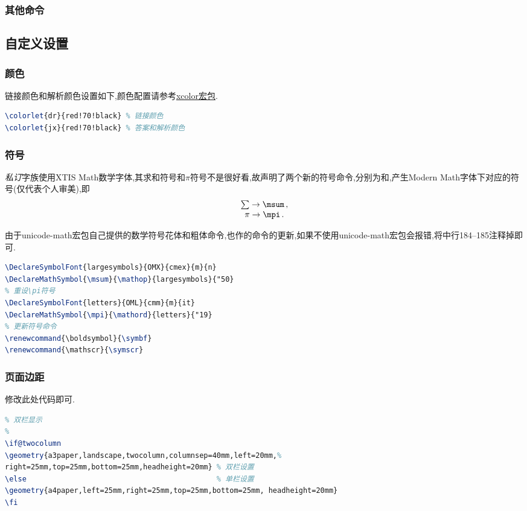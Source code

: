 \documentclass[list,answers,csize4,custom]{sysuexam}
\begin{document}
\subsubsection{其他命令}

\subsection{自定义设置}
\subsubsection{颜色}
链接颜色和解析颜色设置如下,颜色配置请参考\href{https://mirror-hk.koddos.net/CTAN/macros/latex/contrib/xcolor/xcolor.pdf}{xcolor宏包}.
\begin{lstlisting}[title=颜色设置,language=tex,firstnumber=92]
\colorlet{dr}{red!70!black}	% 链接颜色
\colorlet{jx}{red!70!black}	% 答案和解析颜色
\end{lstlisting}

\subsubsection{符号}
\textit{私订}字族使用XTIS Math数学字体,其求和符号和$\pi$符号不是很好看,故声明了两个新的符号命令,分别为和,产生Modern Math字体下对应的符号(仅代表个人审美),即
$$
\begin{array}{c}
\sum \rightarrow \msum \,,\\
\pi  \rightarrow \mpi  \,.
\end{array}
$$

由于unicode-math宏包自己提供的数学符号花体和粗体命令,也作的命令的更新,如果不使用unicode-math宏包会报错,将中行184--185注释掉即可.

\begin{lstlisting}[title={\mt{sysuexam.cls}文件中\mt{\backslash{}msum}和\mt{\backslash{}mpi}}声明和更新命令,language=tex,firstnumber=182]
% 重设\sum符号
\DeclareSymbolFont{largesymbols}{OMX}{cmex}{m}{n}
\DeclareMathSymbol{\msum}{\mathop}{largesymbols}{"50}
% 重设\pi符号
\DeclareSymbolFont{letters}{OML}{cmm}{m}{it}
\DeclareMathSymbol{\mpi}{\mathord}{letters}{"19}
% 更新符号命令
\renewcommand{\boldsymbol}{\symbf}
\renewcommand{\mathscr}{\symscr}
\end{lstlisting}

\subsubsection{页面边距}
修改此处代码即可.
\begin{lstlisting}[title=页面边距设置,language=tex,firstnumber=271]
%
% 双栏显示
%
\if@twocolumn
\geometry{a3paper,landscape,twocolumn,columnsep=40mm,left=20mm,%
right=25mm,top=25mm,bottom=25mm,headheight=20mm} % 双栏设置
\else										     % 单栏设置
\geometry{a4paper,left=25mm,right=25mm,top=25mm,bottom=25mm, headheight=20mm}
\fi
\end{lstlisting}
\end{document}
